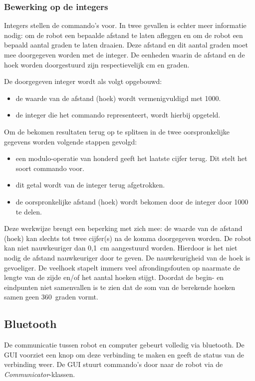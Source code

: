 \documentclass[tt3]{penoverslag}
\begin{document}
\subsubsection{Bewerking op de integers} %
\label{sssec:integer}
Integers stellen de commando's voor. In twee gevallen is echter meer informatie nodig: om de robot een bepaalde afstand te laten afleggen en om de robot een bepaald aantal graden te laten draaien. Deze afstand en dit aantal graden moet mee doorgegeven worden met de integer. De eenheden waarin de afstand en de hoek worden doorgestuurd zijn respectievelijk cm en graden.

De doorgegeven integer wordt als volgt opgebouwd:

\begin{itemize}
\item de waarde van de afstand (hoek) wordt vermenigvuldigd met 1000.
\item de integer die het commando representeert, wordt hierbij opgeteld.
\end{itemize}

Om de bekomen resultaten terug op te splitsen in de twee oorspronkelijke gegevens worden volgende stappen gevolgd:

\begin{itemize}
\item een modulo-operatie van honderd geeft het laatste cijfer terug. Dit stelt het soort commando voor.
\item dit getal wordt van de integer terug afgetrokken.
\item de oorspronkelijke afstand (hoek) wordt bekomen door de integer door 1000 te delen.
\end{itemize}

Deze werkwijze brengt een beperking met zich mee: de waarde van de afstand (hoek) kan slechts tot twee cijfer(s) na de komma doorgegeven worden. De robot kan niet nauwkeuriger dan 0,1~cm aangestuurd worden. Hierdoor is het niet nodig de afstand nauwkeuriger door te geven. De nauwkeurigheid van de hoek is gevoeliger. De veelhoek stapelt immers veel afrondingsfouten op naarmate de lengte van de zijde en/of het aantal hoeken stijgt. Doordat de begin- en eindpunten niet samenvallen is te zien dat de som van de berekende hoeken samen geen 360~graden vormt. 

\subsection{Bluetooth} %
\label{ssec:bluetooth}
De communicatie tussen robot en computer gebeurt volledig via bluetooth. De GUI voorziet een knop om deze verbinding te maken en geeft de status van de verbinding weer. De GUI stuurt commando's door naar de robot via de \textit{Communicator}-klassen.\\
\end{document}
